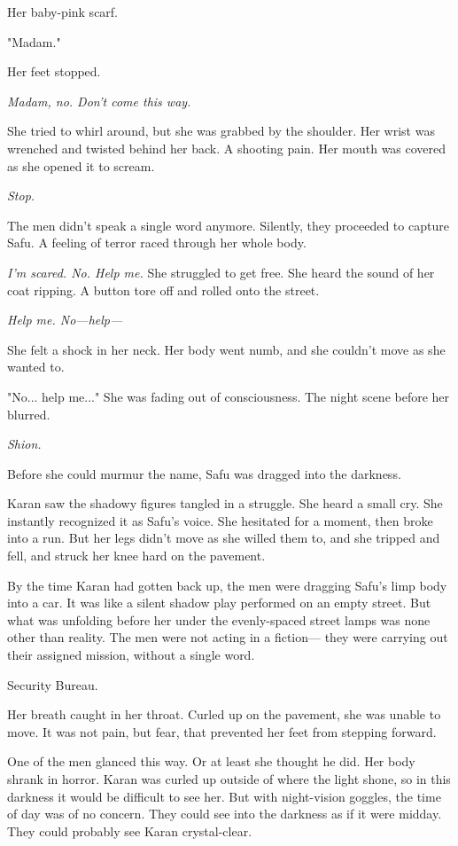 Her baby-pink scarf.

"Madam."

Her feet stopped.

\emph{Madam, no. Don't come this way.}

She tried to whirl around, but she was grabbed by the shoulder. Her
wrist was wrenched and twisted behind her back. A shooting pain. Her
mouth was covered as she opened it to scream.

\emph{Stop.}

The men didn't speak a single word anymore. Silently, they proceeded to
capture Safu. A feeling of terror raced through her whole body.

\emph{I'm scared. No. Help me.} She struggled to get free. She heard the sound
of her coat ripping. A button tore off and rolled onto the street.

\emph{Help me. No---help---}

She felt a shock in her neck. Her body went numb, and she couldn't move
as she wanted to.

"No... help me..." She was fading out of consciousness. The night scene
before her blurred.

\emph{Shion.}

Before she could murmur the name, Safu was dragged into the darkness.

\myspace

Karan saw the shadowy figures tangled in a struggle. She heard a small
cry. She instantly recognized it as Safu's voice. She hesitated for a
moment, then broke into a run. But her legs didn't move as she willed
them to, and she tripped and fell, and struck her knee hard on the
pavement.

By the time Karan had gotten back up, the men were dragging Safu's limp
body into a car. It was like a silent shadow play performed on an empty
street. But what was unfolding before her under the evenly-spaced street
lamps was none other than reality. The men were not acting in a fiction---
they were carrying out their assigned mission, without a single word.

Security Bureau.

Her breath caught in her throat. Curled up on the pavement, she was
unable to move. It was not pain, but fear, that prevented her feet from
stepping forward.

One of the men glanced this way. Or at least she thought he did. Her
body shrank in horror. Karan was curled up outside of where the light
shone, so in this darkness it would be difficult to see her. But with
night-vision goggles, the time of day was of no concern. They could see
into the darkness as if it were midday. They could probably see Karan
crystal-clear.

